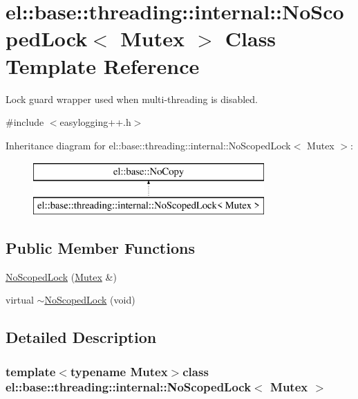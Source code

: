 \hypertarget{classel_1_1base_1_1threading_1_1internal_1_1_no_scoped_lock}{}\section{el\+:\+:base\+:\+:threading\+:\+:internal\+:\+:No\+Scoped\+Lock$<$ Mutex $>$ Class Template Reference}
\label{classel_1_1base_1_1threading_1_1internal_1_1_no_scoped_lock}


Lock guard wrapper used when multi-\/threading is disabled.  




{\ttfamily \#include $<$easylogging++.\+h$>$}

Inheritance diagram for el\+:\+:base\+:\+:threading\+:\+:internal\+:\+:No\+Scoped\+Lock$<$ Mutex $>$\+:\begin{figure}[H]
\begin{center}
\leavevmode
\includegraphics[height=2.000000cm]{classel_1_1base_1_1threading_1_1internal_1_1_no_scoped_lock}
\end{center}
\end{figure}
\subsection*{Public Member Functions}
\begin{DoxyCompactItemize}
\item 
\hyperlink{classel_1_1base_1_1threading_1_1internal_1_1_no_scoped_lock_a020f8cea6e83f40ea29662ef57a58235}{No\+Scoped\+Lock} (\hyperlink{namespaceel_1_1base_1_1threading_ab9400eb234a82878e8458a65f9774320}{Mutex} \&)
\item 
virtual \hyperlink{classel_1_1base_1_1threading_1_1internal_1_1_no_scoped_lock_ae51ca0f4952dd1e99322cda553f472e8}{$\sim$\+No\+Scoped\+Lock} (void)
\end{DoxyCompactItemize}


\subsection{Detailed Description}
\subsubsection*{template$<$typename Mutex$>$class el\+::base\+::threading\+::internal\+::\+No\+Scoped\+Lock$<$ Mutex $>$}

